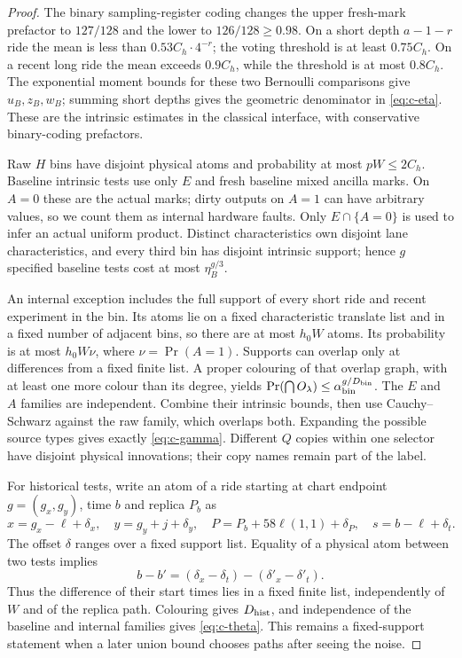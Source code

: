 \begin{proof}
The binary sampling-register coding changes the upper fresh-mark prefactor to
\(127/128\) and the lower to \(126/128\ge 0.98\). On a short depth
\(a-1-r\) ride the mean is less than \(0.53C_h\cdot4^{-r}\); the voting
threshold is at least \(0.75C_h\). On a recent long ride the mean exceeds
\(0.9C_h\), while the threshold is at most \(0.8C_h\). The exponential
moment bounds for these two Bernoulli comparisons give \(u_B,z_B,w_B\);
summing short depths gives the geometric denominator in
\eqref{eq:c-eta}. These are the intrinsic estimates in the classical
interface, with conservative binary-coding prefactors.

Raw \(H\) bins have disjoint physical atoms and probability at most
\(pW\le2C_h\). Baseline intrinsic tests use only \(E\) and fresh baseline mixed ancilla
marks. On \(A=0\) these are the actual marks; dirty outputs on \(A=1\)
can have arbitrary values, so we count them as internal hardware faults. Only
\(E\cap\{A=0\}\) is used to infer an actual uniform product. Distinct characteristics own disjoint lane characteristics, and
every third bin has disjoint intrinsic support; hence \(g\) specified
baseline tests cost at most \(\eta_B^{g/3}\).

An internal exception includes the full support of every short ride and
recent experiment in the bin. Its atoms lie on a fixed characteristic
translate list and in a fixed number of adjacent bins, so there are at
most \(h_0W\) atoms. Its probability is at most \(h_0W\nu\), where
\(\nu=\Pr(A=1)\). Supports can overlap only at differences from a fixed
finite list. A proper colouring of that overlap graph, with at least
one more colour than its degree, yields
\(\Pr(\bigcap O_\lambda)\le\alpha_{\rm bin}^{g/D_{\rm bin}}\).
The \(E\) and \(A\) families are independent. Combine their intrinsic
bounds, then use Cauchy--Schwarz against the raw family, which overlaps
both. Expanding the possible source types gives exactly
\eqref{eq:c-gamma}. Different \(Q\) copies within one selector have disjoint physical
innovations; their copy names remain part of the label.

For historical tests, write an atom of a ride starting at chart endpoint
\(g=(g_x,g_y)\), time \(b\) and replica \(P_b\) as
\[
 x=g_x-\ell+\delta_x,\quad y=g_y+j+\delta_y,
 \quad P=P_b+58\ell(1,1)+\delta_P,
 \quad s=b-\ell+\delta_t.
\]
The offset \(\delta\) ranges over a fixed support list. Equality of a
physical atom between two tests implies
\[
 b-b'=(\delta_x-\delta_t)-(\delta'_x-\delta'_t).
\]
Thus the difference of their start times lies in a fixed finite list,
independently of \(W\) and of the replica path. Colouring gives
\(D_{\rm hist}\), and independence of the baseline and internal
families gives \eqref{eq:c-theta}. This remains a fixed-support statement
when a later union bound chooses paths after seeing the noise.


\end{proof}
